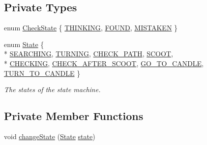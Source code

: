 \subsection*{Private Types}
\begin{DoxyCompactItemize}
\item 
enum \hyperlink{classSearcher_a2c16b7eb56e090a7b832da7f2c9d5e9c}{Check\-State} \{ \hyperlink{classSearcher_a2c16b7eb56e090a7b832da7f2c9d5e9ca3ab7d02ec8c70edce3b79cef009feaae}{T\-H\-I\-N\-K\-I\-N\-G}, 
\hyperlink{classSearcher_a2c16b7eb56e090a7b832da7f2c9d5e9ca464345238bfd562b33e293b4ce8a5f06}{F\-O\-U\-N\-D}, 
\hyperlink{classSearcher_a2c16b7eb56e090a7b832da7f2c9d5e9ca2e776f179e07bdd02764f1b78aeda8b9}{M\-I\-S\-T\-A\-K\-E\-N}
 \}
\item 
enum \hyperlink{classSearcher_ae8599d557b97324ac716e105dc044c57}{State} \{ \\*
\hyperlink{classSearcher_ae8599d557b97324ac716e105dc044c57a2ae2adf7296bc018ccfa3e4cb7f017db}{S\-E\-A\-R\-C\-H\-I\-N\-G}, 
\hyperlink{classSearcher_ae8599d557b97324ac716e105dc044c57af464509a3d677b55121f97c25d823202}{T\-U\-R\-N\-I\-N\-G}, 
\hyperlink{classSearcher_ae8599d557b97324ac716e105dc044c57a2182c983b5957f0a3fdc4251654acbe5}{C\-H\-E\-C\-K\-\_\-\-P\-A\-T\-H}, 
\hyperlink{classSearcher_ae8599d557b97324ac716e105dc044c57a1a45d3084f55b040010a5fc9fc5ee0bf}{S\-C\-O\-O\-T}, 
\\*
\hyperlink{classSearcher_ae8599d557b97324ac716e105dc044c57a79cee82e851194da5965420a078ec4ff}{C\-H\-E\-C\-K\-I\-N\-G}, 
\hyperlink{classSearcher_ae8599d557b97324ac716e105dc044c57aa966ccae58e54ef312b8a63e81135543}{C\-H\-E\-C\-K\-\_\-\-A\-F\-T\-E\-R\-\_\-\-S\-C\-O\-O\-T}, 
\hyperlink{classSearcher_ae8599d557b97324ac716e105dc044c57a7343adc6b3d00f640fc450a98d10a6d6}{G\-O\-\_\-\-T\-O\-\_\-\-C\-A\-N\-D\-L\-E}, 
\hyperlink{classSearcher_ae8599d557b97324ac716e105dc044c57a9acc62c7adaafa496e626fffad278a2f}{T\-U\-R\-N\-\_\-\-T\-O\-\_\-\-C\-A\-N\-D\-L\-E}
 \}
\begin{DoxyCompactList}\small\item\em The states of the state machine. \end{DoxyCompactList}\end{DoxyCompactItemize}
\subsection*{Private Member Functions}
\begin{DoxyCompactItemize}
\item 
void \hyperlink{classSearcher_a96bbc956347affc50d2365018535aa52}{change\-State} (\hyperlink{classSearcher_ae8599d557b97324ac716e105dc044c57}{State} \hyperlink{classSearcher_aadc83ce2d77610d6572f98ecd8b4d6e4}{state})
\end{DoxyCompactItemize}

